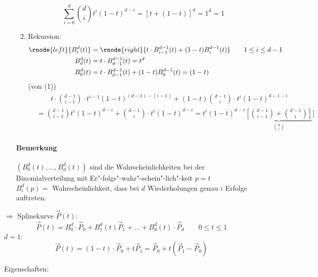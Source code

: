 \begin{itemize}
\begin{enumerate}
		\Bew	\[\sum\limits_{i=0}^{d} \binom{d}{i} t^i (1-t)^{d-i} = [t + (1-t)]^d = 1^d = 1\]
	 \item Rekursion:
		\begin{align*}
		\rnode{left}{B_i^d(t)} &= \rnode{right}{t \cdot B_{i-1}^{d-1}(t) + (1-t)B_i^{d-1}(t)} \qquad 1 \le i \le d - 1\\
		 B_d^d(t) &= t \cdot B_{d-1}^{d-1}(t)	= t^d \\
		 B_0^d(t) &= t \cdot B_{d-1}^{d-1}(t) + (1-t) B_0^{d-1}(t) = (1-t)
		\end{align*}
		\Bew (von (1))
			\begin{align*}
			 & \qquad t \cdot \binom{d-1}{i-1} \cdot t^{i-1} (1-t)^{(d-1)-(i-1)} + (1-t) \binom{d-1}{i} \cdot
				t^{i} (1-t)^{d-1-i}\\
			 &= \binom{d-1}{i-1}t^i (1-t)^{d-i} + \binom{d-1}{i} \cdot t^i (1-t)^{d-i}
				= t^i (1-t)^{d-i} \underbrace{\left[\binom{d-1}{i-1}+ \binom{d-1}{i}\right]}_{\binom{d}{i}}]
			\end{align*}
	\end{enumerate}
	\paragraph*{Bemerkung} $(B_0^d(t), ..., B_d^d(t))$ sind die Wahrscheinlichkeiten bei der Binomialverteilung mit
	Er"-folgs"-wahr"-schein"-lich"-keit $p = t$\\[1em]
	$B_i^d(p) =$ Wahrscheinlichkeit, dass bei $d$ Wiederholungen genau $i$ Erfolge auftreten.
\end{itemize}
$\Rightarrow$ Splinekurve $\vec P(t)$:
\[
 \boxed{\vec P(t) = B_0^d \cdot \vec P_0 + B_1^d(t) \vec P_1 + ... + B_d^d(t) \cdot \vec P_d} \qquad 0 \le t \le 1
\]
$d = 1$:
\[\vec P(t) = (1-t) \cdot \vec P_0 + t \vec P_1 = \vec P_0 + t(\vec P_1 - \vec P_0)\]
\begin{center}
\end{center}
Eigenschaften:
